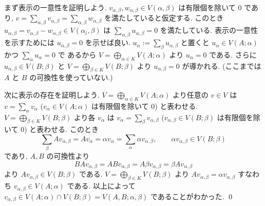 \documentclass[12pt,twoside]{jarticle}
\begin{document}
まず表示の一意性を証明しよう. $v_{\alpha,\beta},w_{\alpha,\beta}\in 
V(\alpha,\beta)$ は有限個を除いて $0$ であり,  $v=
\sum_{\alpha,\beta} v_{\alpha,\beta}=
\sum_{\alpha,\beta} w_{\alpha,\beta}$ を満たしていると仮定する.
このとき $u_{\alpha,\beta}=
v_{\alpha,\beta}-w_{\alpha,\beta}\in V(\alpha_i,\beta)$ 
は $\sum_{\alpha,\beta}u_{\alpha,\beta}=0$ を満たしている.  
表示の一意性を示すためには $u_{\alpha,\beta}=0$ を示せば良い.
$u_\alpha:=\sum_\beta u_{\alpha,\beta}$ 
と置くと $u_\alpha\in V(A;\alpha)$ かつ $\sum_\alpha u_\alpha=0$ で
あるから $V=\bigoplus_{\alpha\in K}V(A;\alpha)$ より $u_\alpha=0$ である.
さらに $u_{\alpha,\beta}\in V(B;\beta)$ 
と $V=\bigoplus_{\beta\in K} V(B;\beta)$ より $u_{\alpha,\beta}=0$ が導かれる.
(ここまでは $A$ と $B$ の可換性を使っていない.)

次に表示の存在を証明しよう. 
$V=\bigoplus_{\alpha\in K}V(A;\alpha)$ より任意の $v\in V$ 
は $v=\sum_\alpha v_\alpha$ ($v_\alpha\in V(A;\alpha)$ は有限個を除いて $0$) 
と表わせる.   $V=\bigoplus_{\beta\in K}V(B;\beta)$ より各 $v_\alpha$ 
は $v_\alpha=\sum_\beta v_{\alpha,\beta}$ 
($v_{\alpha,\beta}\in V(B;\beta)$ は有限個を除いて $0$) と表わせる.
このとき 
\begin{equation*}
  \sum_\beta A v_{\alpha,\beta} 
  = A v_\alpha 
  = \alpha v_\alpha
  = \sum_\alpha \alpha v_{\alpha,\beta}, 
  \qquad
  \alpha v_{\alpha,\beta} \in V(B;\beta)
\end{equation*}
であり, $A,B$ の可換性より
\begin{equation*}
  B A v_{\alpha,\beta} 
  = A B v_{\alpha,\beta} 
  = A \beta v_{\alpha,\beta} 
  = \beta A v_{\alpha,\beta}
\end{equation*}
より $A v_{\alpha,\beta}\in V(B;\beta)$ である. 
$V=\bigoplus_{\beta\in K}V(B;\beta)$ 
より $A v_{\alpha,\beta}=\alpha v_{\alpha,\beta}$ 
すなわち $v_{\alpha,\beta}\in V(A;\alpha)$ である.
以上によって $v_{\alpha,\beta}\in V(A;\alpha)\cap V(B;\beta)
=V(A,B;\alpha,\beta)$ であることがわかった.
\qed

\end{document}
